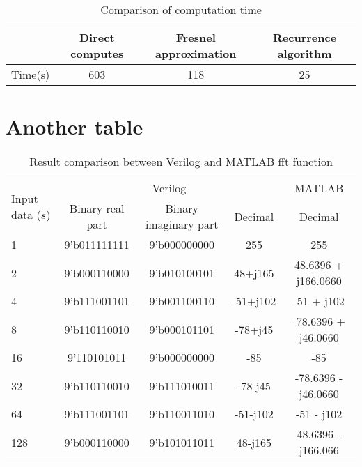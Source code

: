 \begin{table}[htbp!]
\caption[Comparison of computation time]{Comparison of computation time \cite{RecurrenceAlgorithm}}
\centering
{}
\label{table:PSS_ComputationTime}
\begin{adjustbox}{width=\textwidth}
\begin{tabular}{l c c c}
\toprule
& Direct computes & Fresnel approximation& Recurrence algorithm\\
\hline
Time(s) & 603 & 118 & 25 \\
\bottomrule
\end{tabular}
\end{adjustbox}
\end{table}
\section{Another table}
\begin{table}[H]
\caption{Result comparison between Verilog and MATLAB fft function}
\centering
\label{table:Radix_2FFT}
\begin{adjustbox}{width=\textwidth}
\begin{tabular}{l c c c c}
\toprule
\multirow{2}{*}{Input data ($s$)} & \multicolumn{3}{c}{Verilog} & \multicolumn{1}{c}{MATLAB} \\ 
\cmidrule{2-5}
   & Binary real part & Binary imaginary part & Decimal & Decimal \\ 
\midrule
1 & 9'b011111111 & 9'b000000000 & 255 & 255\\
2 & 9'b000110000 & 9'b010100101 & 48+j165  & 48.6396 + j166.0660  \\
4 & 9'b111001101 & 9'b001100110 & -51+j102  & -51 + j102  \\
8 & 9'b110110010 & 9'b000101101 & -78+j45  & -78.6396 + j46.0660  \\
16 & 9'110101011 & 9'b000000000 & -85  & -85 \\
32 & 9'b110110010 & 9'b111010011 & -78-j45 & -78.6396 - j46.0660  \\
64 & 9'b111001101 & 9'b110011010 & -51-j102  & -51 - j102  \\
128 & 9'b000110000 & 9'b101011011 & 48-j165  & 48.6396 -j166.066  \\
\bottomrule
\end{tabular}
\end{adjustbox}
\end{table}